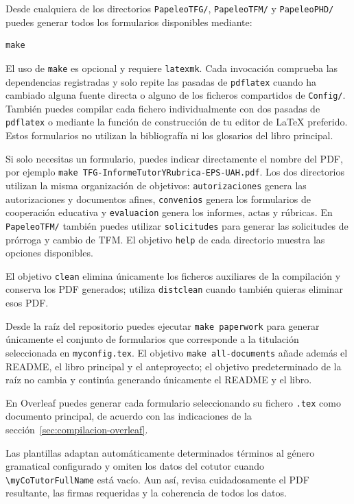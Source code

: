 Desde cualquiera de los directorios \texttt{PapeleoTFG/}, \texttt{PapeleoTFM/} y \texttt{PapeleoPHD/} puedes generar todos los formularios disponibles mediante:

\begin{verbatim}
make
\end{verbatim}

El uso de \texttt{make} es opcional y requiere \texttt{latexmk}. Cada invocación comprueba las dependencias registradas y solo repite las pasadas de \texttt{pdflatex} cuando ha cambiado alguna fuente directa o alguno de los ficheros compartidos de \texttt{Config/}. También puedes compilar cada fichero individualmente con dos pasadas de \texttt{pdflatex} o mediante la función de construcción de tu editor de \LaTeX{} preferido. Estos formularios no utilizan la bibliografía ni los glosarios del libro principal.

Si solo necesitas un formulario, puedes indicar directamente el nombre del PDF, por ejemplo \texttt{make TFG-InformeTutorYRubrica-EPS-UAH.pdf}. Los dos directorios utilizan la misma organización de objetivos: \texttt{autorizaciones} genera las autorizaciones y documentos afines, \texttt{convenios} genera los formularios de cooperación educativa y \texttt{evaluacion} genera los informes, actas y rúbricas. En \texttt{PapeleoTFM/} también puedes utilizar \texttt{solicitudes} para generar las solicitudes de prórroga y cambio de TFM. El objetivo \texttt{help} de cada directorio muestra las opciones disponibles.

El objetivo \texttt{clean} elimina únicamente los ficheros auxiliares de la compilación y conserva los PDF generados; utiliza \texttt{distclean} cuando también quieras eliminar esos PDF.

Desde la raíz del repositorio puedes ejecutar \texttt{make paperwork} para generar únicamente el conjunto de formularios que corresponde a la titulación seleccionada en \texttt{myconfig.tex}. El objetivo \texttt{make all-documents} añade además el README, el libro principal y el anteproyecto; el objetivo predeterminado de la raíz no cambia y continúa generando únicamente el README y el libro.

En Overleaf puedes generar cada formulario seleccionando su fichero \texttt{.tex} como documento principal, de acuerdo con las indicaciones de la sección~\ref{sec:compilacion-overleaf}.

Las plantillas adaptan automáticamente determinados términos al género gramatical configurado y omiten los datos del cotutor cuando \texttt{\textbackslash{}myCoTutorFullName} está vacío. Aun así, revisa cuidadosamente el PDF resultante, las firmas requeridas y la coherencia de todos los datos.

